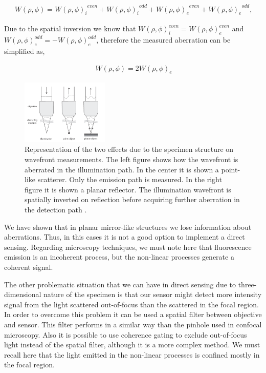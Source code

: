 \begin{align}
	\ W(\rho,\phi) = {{W(\rho,\phi)_i}^{even}} + {{W(\rho,\phi)_i}^{odd}}+{{W(\rho,\phi)_e}^{even}} + {{W(\rho,\phi)_e}^{odd}},
	\label{eq:aberration_sum_il_em}
\end{align}  

Due to the spatial inversion we know that $W(\rho,\phi)_i^{even}=W(\rho,\phi)_e^{even}$ and $W(\rho,\phi)_e^{odd}=-W(\rho,\phi)_e^{odd}$, therefore the measured aberration can be simplified as,  

\begin{align}
	\ W(\rho,\phi)=2 {{W(\rho,\phi)_e}}
	\label{eq:ab_measured_spat_inver}
\end{align} 
 

\begin{figure}[htbp]
	\centering
		\includegraphics[width=0.37\textwidth, height=0.15\textheight]{images/abe_direct_sensing.png}
	\caption{Representation of the two effects due to the specimen structure on wavefront measurements. The left figure shows how the wavefront is aberrated in the illumination path. In the center it is shown a point-like scatterer. Only the emission path is measured. In the right figure it is shown a planar reflector. The illumination wavefront is spatially inverted on reflection before acquiring further aberration in the detection path \cite{AOM_basic_ref}.}
	\label{fig:abe_direct_sensing}
\end{figure}


We have shown that in planar mirror-like structures we lose information about aberrations. Thus, in this cases it is not a good option to implement a direct sensing. Regarding microscopy techniques, we must note here that fluorescence emission is an incoherent process, but the non-linear processes generate a coherent signal.

The other problematic situation that we can have in direct sensing due to three-dimensional nature of the specimen is that our sensor might detect more intensity signal from the light scattered out-of-focus than the scattered in the focal region. In order to overcome this problem it can be used a spatial filter between objective and sensor. This filter performs in a similar way than the pinhole used in confocal microscopy. Also it is possible to use coherence gating to exclude out-of-focus light instead of the spatial filter, although it is a more complex method. We must recall here that the light emitted in the non-linear processes is confined mostly in the focal region.

